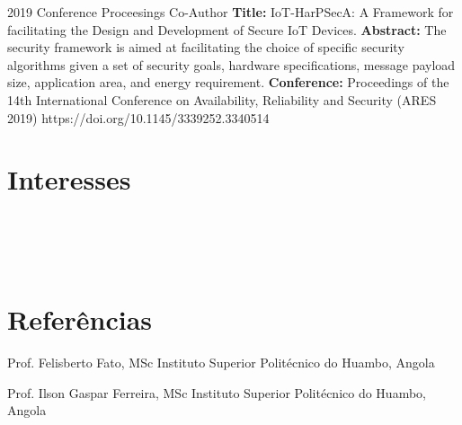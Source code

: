 \begin{entrada}

\public
{2019}
{Conference Proceesings}
{Co-Author}
{\textbf{Title:} IoT-HarPSecA: A Framework for facilitating the Design and Development of Secure IoT Devices.}
{\textbf{Abstract:} The security framework is aimed at facilitating the choice of specific security algorithms given a set of security goals, hardware specifications, message payload size, application area, and energy requirement.}
{\textbf{Conference:} Proceedings of the 14th International Conference on Availability, Reliability and Security (ARES 2019)}
{}{https://doi.org/10.1145/3339252.3340514}
{\vspace{-0.3cm}}
\end{entrada}

\section{Interesses}
  \\
  \\
  \\
  \divider


\section{Referências}
 
\begin{reflist}

  
  {Prof. Felisberto Fato, MSc}
  {Instituto Superior Politécnico do Huambo, Angola}
  {\\
  }
  
 
  {Prof. Ilson Gaspar Ferreira, MSc}
  {Instituto Superior Politécnico do Huambo, Angola}
  {\\
  }

  
\end{reflist}
